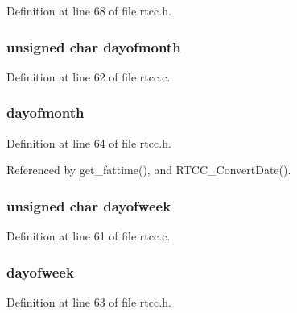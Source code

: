 Definition at line 68 of file rtcc.\-h.

\hypertarget{unionrtcc_date_a1831e463dfd771384f33f0019e242c4c}{
\subsubsection[{dayofmonth}]{\setlength{\rightskip}{0pt plus 5cm}unsigned char dayofmonth}}\label{unionrtcc_date_a1831e463dfd771384f33f0019e242c4c}


Definition at line 62 of file rtcc.\-c.

\hypertarget{unionrtcc_date_af980355fa766196214d34395ebed0a89}{
\subsubsection[{dayofmonth}]{ dayofmonth}}\label{unionrtcc_date_af980355fa766196214d34395ebed0a89}


Definition at line 64 of file rtcc.\-h.



Referenced by get\-\_\-fattime(), and R\-T\-C\-C\-\_\-\-Convert\-Date().

\hypertarget{unionrtcc_date_a162f414b3b2f1e40b9342af6400fc703}{
\subsubsection[{dayofweek}]{\setlength{\rightskip}{0pt plus 5cm}unsigned char dayofweek}}\label{unionrtcc_date_a162f414b3b2f1e40b9342af6400fc703}


Definition at line 61 of file rtcc.\-c.

\hypertarget{unionrtcc_date_a97419c23eb9097f89c83ce342df499f8}{
\subsubsection[{dayofweek}]{ dayofweek}}\label{unionrtcc_date_a97419c23eb9097f89c83ce342df499f8}


Definition at line 63 of file rtcc.\-h.



